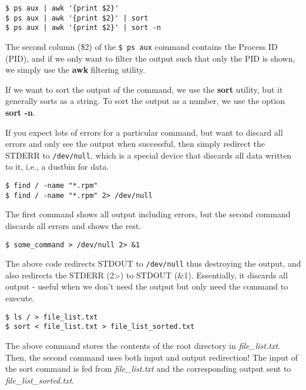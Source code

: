\noindent
\begin{verbatim}
$ ps aux | awk '{print $2}'
$ ps aux | awk '{print $2}' | sort
$ ps aux | awk '{print $2}' | sort -n
\end{verbatim}

\noindent
The second column (\$2) of the \verb|$ ps aux| command contains the Process ID (PID), and if we only want to filter the output such that only the PID is shown, we simply use the \textbf{awk} filtering utility.

If we want to sort the output of the command, we use the \textbf{sort} utility, but it generally sorts as a string. To sort the output as a number, we use the option \textbf{sort -n}.

\noindent
If you expect lots of errors for a particular command, but want to discard all errors and only see the output when successful, then simply redirect the STDERR to \verb|/dev/null|, which is a special device that discards all data written to it, i.e., a dustbin for data.

\begin{verbatim}
$ find / -name "*.rpm"
$ find / -name "*.rpm" 2> /dev/null
\end{verbatim}

\noindent
The first command shows all output including errors, but the second command discards all errors and shows the rest.

\begin{verbatim}
$ some_command > /dev/null 2> &1
\end{verbatim}

\noindent
The above code redirects STDOUT to \verb|/dev/null| thus destroying the output, and also redirects the STDERR (2>) to STDOUT (\&1). Essentially, it discards all output - useful when we don't need the output but only need the command to execute.

\begin{verbatim}
$ ls / > file_list.txt
$ sort < file_list.txt > file_list_sorted.txt
\end{verbatim}

\noindent
The above command stores the contents of the root directory in \textit{file\_list.txt}. Then, the second command uses both input and output redirection! The input of the sort command is fed from \textit{file\_list.txt} and the corresponding output sent to \textit{file\_list\_sorted.txt}.

